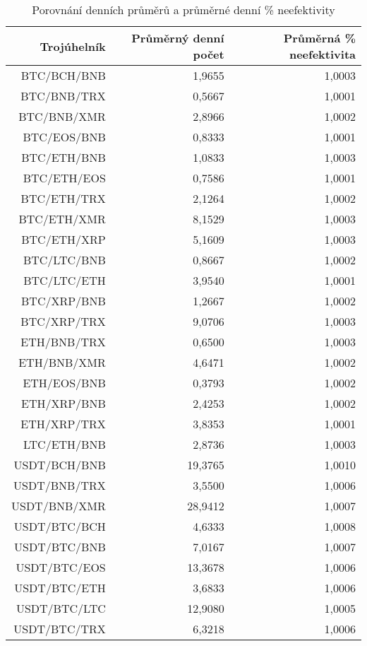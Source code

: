\begin{table}\centering
\caption{Porovnání denních průměrů a průměrné denní \% neefektivity}
\label{table_averages}
\begin{tabular}{|| r | r | r ||}\hline Trojúhelník & Průměrný denní počet & Průměrná \% neefektivita\\
 \hline\hline BTC/BCH/BNB & 1,9655 & 1,0003\\ 
 \hline BTC/BNB/TRX & 0,5667 & 1,0001\\ 
 \hline BTC/BNB/XMR & 2,8966 & 1,0002\\ 
 \hline BTC/EOS/BNB & 0,8333 & 1,0001\\ 
 \hline BTC/ETH/BNB & 1,0833 & 1,0003\\ 
 \hline BTC/ETH/EOS & 0,7586 & 1,0001\\ 
 \hline BTC/ETH/TRX & 2,1264 & 1,0002\\ 
 \hline BTC/ETH/XMR & 8,1529 & 1,0003\\ 
 \hline BTC/ETH/XRP & 5,1609 & 1,0003\\ 
 \hline BTC/LTC/BNB & 0,8667 & 1,0002\\ 
 \hline BTC/LTC/ETH & 3,9540 & 1,0001\\ 
 \hline BTC/XRP/BNB & 1,2667 & 1,0002\\ 
 \hline BTC/XRP/TRX & 9,0706 & 1,0003\\ 
 \hline ETH/BNB/TRX & 0,6500 & 1,0003\\ 
 \hline ETH/BNB/XMR & 4,6471 & 1,0002\\ 
 \hline ETH/EOS/BNB & 0,3793 & 1,0002\\ 
 \hline ETH/XRP/BNB & 2,4253 & 1,0002\\ 
 \hline ETH/XRP/TRX & 3,8353 & 1,0001\\ 
 \hline LTC/ETH/BNB & 2,8736 & 1,0003\\ 
 \hline USDT/BCH/BNB & 19,3765 & 1,0010\\ 
 \hline USDT/BNB/TRX & 3,5500 & 1,0006\\ 
 \hline USDT/BNB/XMR & 28,9412 & 1,0007\\ 
 \hline USDT/BTC/BCH & 4,6333 & 1,0008\\ 
 \hline USDT/BTC/BNB & 7,0167 & 1,0007\\ 
 \hline USDT/BTC/EOS & 13,3678 & 1,0006\\ 
 \hline USDT/BTC/ETH & 3,6833 & 1,0006\\ 
 \hline USDT/BTC/LTC & 12,9080 & 1,0005\\ 
 \hline USDT/BTC/TRX & 6,3218 & 1,0006\\ 

\end{tabular}
\end{table}
